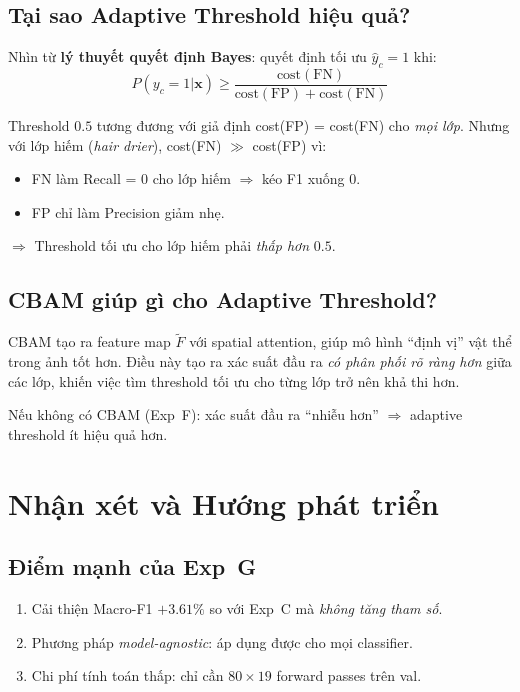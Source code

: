 \documentclass{article}
\begin{document}
\subsection{Tại sao Adaptive Threshold hiệu quả?}

Nhìn từ \textbf{lý thuyết quyết định Bayes}: quyết định tối ưu
$\hat{y}_c = 1$ khi:
\begin{equation}
  P(y_c=1 | \mathbf{x}) \geq \frac{\text{cost}(\text{FN})}{\text{cost}(\text{FP}) + \text{cost}(\text{FN})}
\end{equation}

Threshold $0.5$ tương đương với giả định cost(FP) = cost(FN) cho \textit{mọi lớp}.
Nhưng với lớp hiếm (\textit{hair drier}), cost(FN) $\gg$ cost(FP) vì:
\begin{itemize}[leftmargin=1.8em]
  \item FN làm Recall = 0 cho lớp hiếm $\Rightarrow$ kéo F1 xuống 0.
  \item FP chỉ làm Precision giảm nhẹ.
\end{itemize}
$\Rightarrow$ Threshold tối ưu cho lớp hiếm phải \textit{thấp hơn} $0.5$.

\subsection{CBAM giúp gì cho Adaptive Threshold?}

CBAM tạo ra feature map $\tilde{F}$ với spatial attention, giúp mô hình
``định vị'' vật thể trong ảnh tốt hơn. Điều này tạo ra xác suất đầu ra
\textit{có phân phối rõ ràng hơn} giữa các lớp, khiến việc tìm threshold
tối ưu cho từng lớp trở nên khả thi hơn.

Nếu không có CBAM (Exp~F): xác suất đầu ra ``nhiễu hơn'' $\Rightarrow$
adaptive threshold ít hiệu quả hơn.

\section{Nhận xét và Hướng phát triển}

\subsection{Điểm mạnh của Exp~G}
\begin{enumerate}[leftmargin=2em]
  \item Cải thiện Macro-F1 $+3.61\%$ so với Exp~C mà \textit{không tăng tham số}.
  \item Phương pháp \textit{model-agnostic}: áp dụng được cho mọi classifier.
  \item Chi phí tính toán thấp: chỉ cần $80 \times 19$ forward passes trên val.
\end{enumerate}
\end{document}
